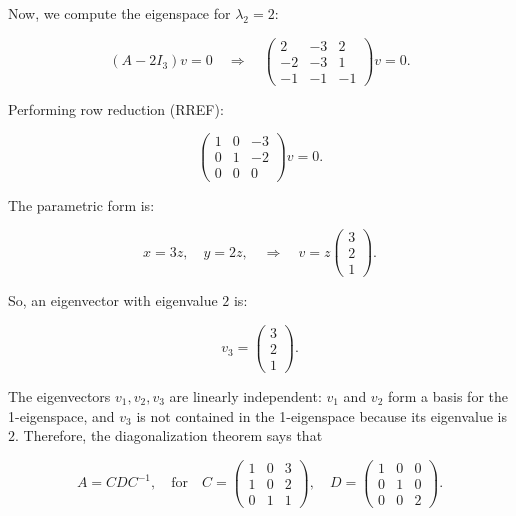 \documentclass[a4paper,12pt]{article}
\begin{document}
Now, we compute the eigenspace for \( \lambda_2 = 2 \):

\[
(A - 2I_3) v = 0 \quad \Rightarrow \quad \begin{pmatrix} 2 & -3 & 2 \\ -2 & -3 & 1 \\ -1 & -1 & -1 \end{pmatrix} v = 0.
\]

Performing row reduction (RREF):

\[
\begin{pmatrix} 1 & 0 & -3 \\ 0 & 1 & -2 \\ 0 & 0 & 0 \end{pmatrix} v = 0.
\]

The parametric form is:

\[
x = 3z, \quad y = 2z, \quad \Rightarrow \quad v = z \begin{pmatrix} 3 \\ 2 \\ 1 \end{pmatrix}.
\]

So, an eigenvector with eigenvalue \( 2 \) is:

\[
v_3 = \begin{pmatrix} 3 \\ 2 \\ 1 \end{pmatrix}.
\]

The eigenvectors \( v_1, v_2, v_3 \) are linearly independent: \( v_1 \) and \( v_2 \) form a basis for the 1-eigenspace, and \( v_3 \) is not contained in the 1-eigenspace because its eigenvalue is \( 2 \). Therefore, the diagonalization theorem says that

\[
A = C D C^{-1}, \quad \text{for} \quad C = \begin{pmatrix} 1 & 0 & 3 \\ 1 & 0 & 2 \\ 0 & 1 & 1 \end{pmatrix}, \quad D = \begin{pmatrix} 1 & 0 & 0 \\ 0 & 1 & 0 \\ 0 & 0 & 2 \end{pmatrix}.
\]
\end{document}
